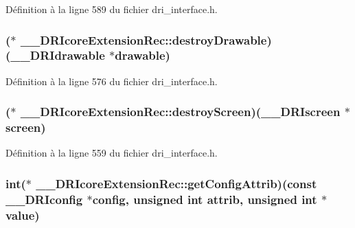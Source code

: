 Définition à la ligne 589 du fichier dri\-\_\-interface.\-h.

\hypertarget{struct_____d_r_icore_extension_rec_a82b397efee01051d5797a1e1d77b8cec}{
\subsubsection[{destroy\-Drawable}]{($\ast$ \-\_\-\-\_\-\-D\-R\-Icore\-Extension\-Rec\-::destroy\-Drawable)({\bf \-\_\-\-\_\-\-D\-R\-Idrawable} $\ast$drawable)}}\label{struct_____d_r_icore_extension_rec_a82b397efee01051d5797a1e1d77b8cec}


Définition à la ligne 576 du fichier dri\-\_\-interface.\-h.

\hypertarget{struct_____d_r_icore_extension_rec_a883e228e8f452c7939a63107ef17326a}{
\subsubsection[{destroy\-Screen}]{($\ast$ \-\_\-\-\_\-\-D\-R\-Icore\-Extension\-Rec\-::destroy\-Screen)({\bf \-\_\-\-\_\-\-D\-R\-Iscreen} $\ast$screen)}}\label{struct_____d_r_icore_extension_rec_a883e228e8f452c7939a63107ef17326a}


Définition à la ligne 559 du fichier dri\-\_\-interface.\-h.

\hypertarget{struct_____d_r_icore_extension_rec_ae6ce8717daa2354781534cf2b2a28e35}{
\subsubsection[{get\-Config\-Attrib}]{\setlength{\rightskip}{0pt plus 5cm}int($\ast$ \-\_\-\-\_\-\-D\-R\-Icore\-Extension\-Rec\-::get\-Config\-Attrib)(const {\bf \-\_\-\-\_\-\-D\-R\-Iconfig} $\ast$config, unsigned int attrib, unsigned int $\ast${\bf value})}}\label{struct_____d_r_icore_extension_rec_ae6ce8717daa2354781534cf2b2a28e35}


